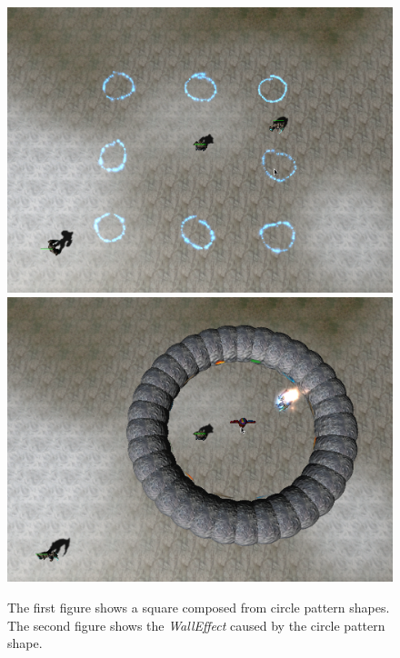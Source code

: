 \begin{figure}[p]
\centering
\includegraphics[width=.9\linewidth]{ext/scr/patcircle.png}
\quad
\includegraphics[width=.9\linewidth]{ext/scr/patcirclee.png}
\caption{The first figure shows a square composed from circle pattern shapes. The second figure shows the \emph{WallEffect} caused by the circle pattern shape. }
\label{fig:spell:patcircle}
\end{figure}

